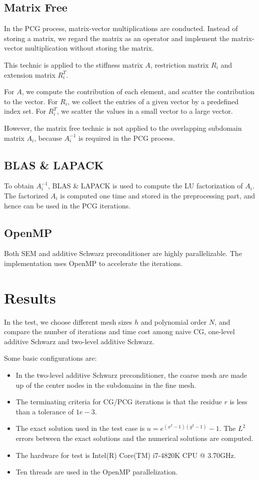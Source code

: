 \documentclass[paper=a4, fontsize=11pt]{scrartcl} %
\begin{document}
\subsection{Matrix Free}

In the PCG process, matrix-vector multiplications are
conducted. Instead of storing a matrix, we regard the matrix as an
operator and implement the matrix-vector multiplication without
storing the matrix.

This technic is applied to the stiffness matrix $A$, restriction
matrix $R_i$ and extension matrix $R_i^T$. 

For $A$, we compute the contribution of each element, and scatter the
contribution to the vector. For $R_i$, we collect the entries
of a given vector by a predefined index set. For $R_i^T$, we scatter
the values in a small vector to a large vector.

However, the matrix free technic is not applied to the overlapping
subdomain matrix $A_i$, because $A_i^{-1}$ is required in the PCG process.

\subsection{BLAS \& LAPACK}

To obtain $A_i^{-1}$, BLAS \& LAPACK is used to compute the LU
factorization of $A_i$.  The factorized $A_i$ is computed one time and stored
in the preprocessing part, and hence can be used in the PCG iterations.

\subsection{OpenMP}
Both SEM and additive Schwarz preconditioner are highly
parallelizable. The implementation uses OpenMP to accelerate the
iterations.


\section{Results}
In the test, we choose different mesh sizes $h$ and polynomial order $N$, and
compare the number of iterations and time cost among naive CG,
one-level additive Schwarz and two-level additive Schwarz.



Some basic configurations are:
\begin{itemize}
\item In the two-level additive Schwarz preconditioner, the coarse mesh are
made up of the center nodes in the subdomains in the fine mesh. 
\item The terminating criteria for CG/PCG iterations is that the residue $r$
is less than a tolerance of $1e-3$. 
\item The exact solution used in the test case is
  $u=e^{(x^2-1)(y^2-1)}-1$. The $L^2$ errors between the exact solutions
  and the numerical solutions are computed.
\item The hardware for test is Intel(R) Core(TM) i7-4820K CPU @
  3.70GHz.
\item Ten threads are used in the OpenMP parallelization.
\end{itemize}
\end{document}
